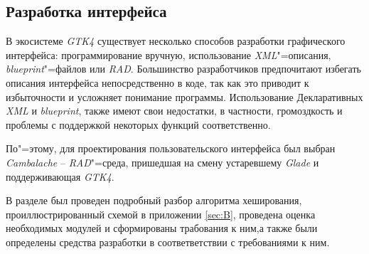 \subsection{Разработка интерфейса}

В экосистеме \textit{GTK4} существует несколько способов разработки графического
интерфейса: программирование вручную, использование \textit{XML}"=описания,
\textit{blueprint}"=файлов или \textit{RAD}. Большинство разработчиков
предпочитают избегать описания интерфейса непосредственно в коде, так как это
приводит к избыточности и усложняет понимание программы. Использование
Декларативных \textit{XML} и \textit{blueprint}, также имеют свои недостатки, в
частности, громоздкость и проблемы с поддержкой некоторых функций
соответственно.

По"=этому, для проектирования пользовательского интерфейса был выбран
\textit{Cambalache} -- \textit{RAD}"=среда, пришедшая на смену устаревшему
\textit{Glade} и поддерживающая \textit{GTK4}.

\vspace{\baselineskip}

В разделе был проведен подробный разбор алгоритма хеширования,
проиллюстрированный схемой в приложении \ref{sec:B}, проведена оценка
необходимых модулей и сформированы трабования к ним,а также были определены
средства разработки в соответветствии с требованиями к ним.

